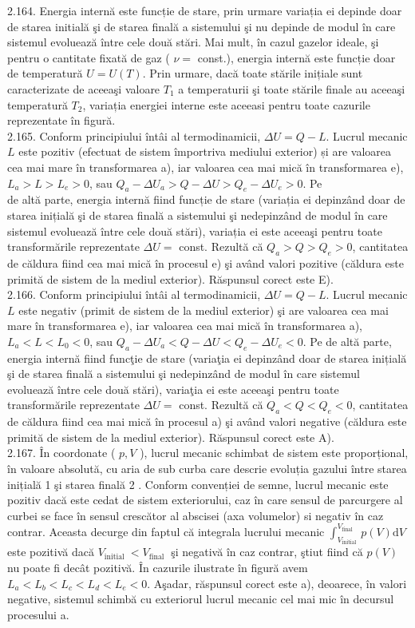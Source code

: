 2.164. Energia internă este funcție de stare, prin urmare variația ei depinde doar de starea initială şi de starea finală a sistemului şi nu depinde de modul în care sistemul evoluează între cele două stări. Mai mult, în cazul gazelor ideale, şi pentru o cantitate fixată de gaz ( $\nu=$ const.), energia internă este funcție doar de temperatură $U=U(T)$. Prin urmare, dacă toate stările inițiale sunt caracterizate de aceeaşi valoare $T_{1}$ a temperaturii şi toate stările finale au aceeaşi temperatură $T_{2}$, variația energiei interne este aceeasi pentru toate cazurile reprezentate în figură.\\
2.165. Conform principiului întâi al termodinamicii, $\Delta U=Q-L$. Lucrul mecanic $L$ este pozitiv (efectuat de sistem împortriva mediului exterior) și are valoarea cea mai mare în transformarea a), iar valoarea cea mai mică în transformarea e), $L_{a}>L>L_{e}>0$, sau $Q_{a}-\Delta U_{a}>Q-\Delta U>Q_{e}-\Delta U_{e}>0$. Pe\\
de altă parte, energia internă fiind funcție de stare (variația ei depinzând doar de starea inițială şi de starea finală a sistemului şi nedepinzând de modul în care sistemul evoluează între cele două stări), variația ei este aceeaşi pentru toate transformările reprezentate $\Delta U=$ const. Rezultă că $Q_{a}>Q>Q_{e}>0$, cantitatea de căldura fiind cea mai mică în procesul e) şi având valori pozitive (căldura este primită de sistem de la mediul exterior). Răspunsul corect este E).\\
2.166. Conform principiului întâi al termodinamicii, $\Delta U=Q-L$. Lucrul mecanic $L$ este negativ (primit de sistem de la mediul exterior) şi are valoarea cea mai mare în transformarea e), iar valoarea cea mai mică în transformarea a), $L_{a}<L<L_{0}<0$, sau $Q_{a}-\Delta U_{a}<Q-\Delta U<Q_{e}-\Delta U_{e}<0$. Pe de altă parte, energia internă fiind funcţie de stare (variaţia ei depinzând doar de starea inițială şi de starea finală a sistemului şi nedepinzând de modul în care sistemul evoluează între cele două stări), variaţia ei este aceeaşi pentru toate transformările reprezentate $\Delta U=$ const. Rezultă că $Q_{a}<Q<Q_{e}<0$, cantitatea de căldura fiind cea mai mică în procesul a) şi având valori negative (căldura este primită de sistem de la mediul exterior). Răspunsul corect este A).\\
2.167. În coordonate ( $p, V$ ), lucrul mecanic schimbat de sistem este proporțional, în valoare absolută, cu aria de sub curba care descrie evoluția gazului între starea inițială 1 şi starea finală 2 . Conform convenției de semne, lucrul mecanic este pozitiv dacă este cedat de sistem exteriorului, caz în care sensul de parcurgere al curbei se face în sensul crescător al abscisei (axa volumelor) si negativ în caz contrar. Aceasta decurge din faptul că integrala lucrului mecanic $\int_{V_{\text {initial }}}^{V_{\text {final }}} p(V) \mathrm{d} V$ este pozitivă dacă $V_{\text {initial }}<V_{\text {final }}$ şi negativă în caz contrar, ştiut fiind că $p(V)$ nu poate fi decât pozitivă. În cazurile ilustrate în figură avem $L_{a}<L_{b}<L_{c}<L_{d}<L_{e}<0$. Aşadar, răspunsul corect este a), deoarece, în valori negative, sistemul schimbă cu exteriorul lucrul mecanic cel mai mic în decursul procesului a.\\
